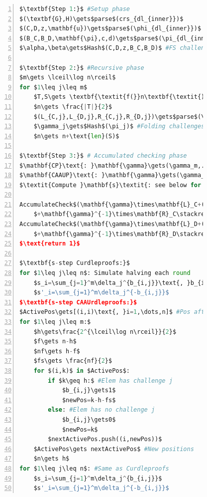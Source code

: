 \begin{figure}[!htb]
        \begin{lstlisting}[language=Python,mathescape=true,label={lst:ipa-verifier-optimized},numbers=left,caption={Optimized verifier computation for CAAU-IPA in CAAUrdleproofs},captionpos=b,frame=single]
$\textbf{Step 1:}$ #Setup phase
$(\textbf{G},H)\gets$parse$(crs_{dl_{inner}})$
$(C,D,z,\mathbf{u})\gets$parse$(\phi_{dl_{inner}})$
$(B_C,B_D,\mathbf{\pi},c,d)\gets$parse$(\pi_{dl_{inner}})$
$\alpha,\beta\gets$Hash$(C,D,z,B_C,B_D)$ #FS challenges

$\textbf{Step 2:}$ #Recursive phase
$m\gets \lceil\log n\rceil$
for $1\leq j\leq m$
    $T,S\gets \textbf{\textit{f(}}n\textbf{\textit{)}}$ #Scheme function
    $n\gets \frac{|T|}{2}$
    $(L_{C,j},L_{D,j},R_{C,j},R_{D,j})\gets$parse$(\pi_j)$ #Proof elem
    $\gamma_j\gets$Hash$(\pi_j)$ #Folding challenges
    $n\gets n+\text{len}(S)$

$\textbf{Step 3:}$ # Accumulated checking phase
$\mathbf{CP}\text{: }\mathbf{\gamma}\gets(\gamma_m,...,\gamma_1)$ #Construction difference
$\mathbf{CAAUP}\text{: }\mathbf{\gamma}\gets(\gamma_1,...,\gamma_m)$
$\textit{Compute }\mathbf{s}\textit{: see below for difference}$

AccumulateCheck$(\mathbf{\gamma}\times\mathbf{L}_C+(B_C+\alpha C+(\alpha^2z)H)$
    $+\mathbf{\gamma}^{-1}\times\mathbf{R}_C\stackrel{?}{=}(c\mathbf{s}\| cd\beta)\times(\mathbf{G}\| H))$
AccumulateCheck$(\mathbf{\gamma}\times\mathbf{L}_D+(B_D+\alpha D)$
    $+\mathbf{\gamma}^{-1}\times\mathbf{R}_D\stackrel{?}{=}d(\mathbf{s'}\circ\mathbf{u})\times\mathbf{G})$
$\text{return 1}$

$\textbf{s-step Curdleproofs:}$
for $1\leq j\leq n$: Simulate halving each round
    $s_i=\sum_{j=1}^m\delta_j^{b_{i,j}}\text{, }b_{i,j}\in\{0,1\}\text{ s.t. }i=\sum_{j=1}^mb_{i,j}2^j$
    $s'_i=\sum_{j=1}^m\delta_j^{-b_{i,j}}$
$\textbf{s-step CAAUrdleproofs:}$
$ActivePos\gets[(i,i)\text{, }i=1,\dots,n]$ #Pos after round
for $1\leq j\leq m:$
    $h\gets\frac{2^{\lceil\log n\rceil}}{2}$
    $f\gets n-h$
    $nf\gets h-f$
    $fs\gets \frac{nf}{2}$
    for $(i,k)$ in $ActivePos$:
        if $k\geq h:$ #Elem has challenge j
            $b_{i,j}\gets1$
            $newPos=k-h-fs$
        else: #Elem has no challenge j
            $b_{i,j}\gets0$
            $newPos=k$
        $nextActivePos.push((i,newPos))$
    $ActivePos\gets nextActivePos$ #New positions
    $n\gets h$
for $1\leq j\leq n$: #Same as Curdleproofs
    $s_i=\sum_{j=1}^m\delta_j^{b_{i,j}}$
    $s'_i=\sum_{j=1}^m\delta_j^{-b_{i,j}}$
        \end{lstlisting}
    \label{fig:ipa-verifier-optimized}
\end{figure}

